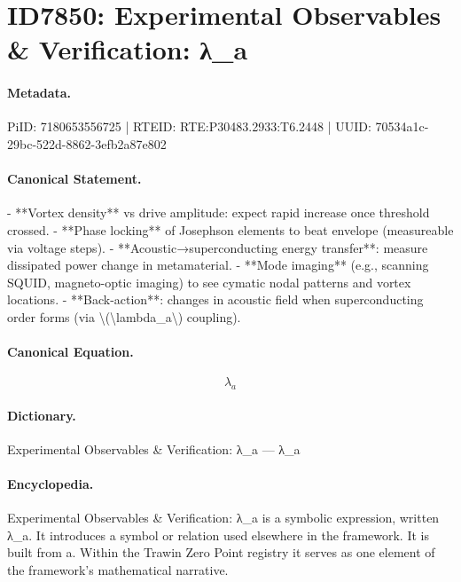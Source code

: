 \section*{ID7850: Experimental Observables \& Verification: λ\_a}
\paragraph{Metadata.}
PiID: 7180653556725 | RTEID: RTE:P30483.2933:T6.2448 | UUID: 70534a1c-29bc-522d-8862-3efb2a87e802

\paragraph{Canonical Statement.}
- **Vortex density** vs drive amplitude: expect rapid increase once threshold crossed. - **Phase locking** of Josephson elements to beat envelope (measureable via voltage steps). - **Acoustic→superconducting energy transfer**: measure dissipated power change in metamaterial. - **Mode imaging** (e.g., scanning SQUID, magneto-optic imaging) to see cymatic nodal patterns and vortex locations. - **Back-action**: changes in acoustic field when superconducting order forms (via \textbackslash{}(\textbackslash{}lambda\_a\textbackslash{}) coupling).

\paragraph{Canonical Equation.}
\[
\lambda_a
\]

\paragraph{Dictionary.}
Experimental Observables \& Verification: λ\_a — λ\_a

\paragraph{Encyclopedia.}
Experimental Observables \& Verification: λ\_a is a symbolic expression, written λ\_a. It introduces a symbol or relation used elsewhere in the framework. It is built from a. Within the Trawin Zero Point registry it serves as one element of the framework's mathematical narrative.

